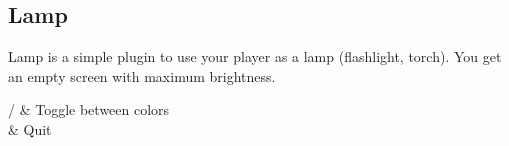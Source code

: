 \subsection{Lamp}
Lamp is a simple plugin to use your player as a lamp (flashlight, torch).
You get an empty screen with maximum brightness.
\begin{table}
    \begin{btnmap}{}{}
    \ButtonLeft/\ButtonRight 
        & Toggle between colors\\
        & Quit\\
    \end{btnmap}
\end{table}
